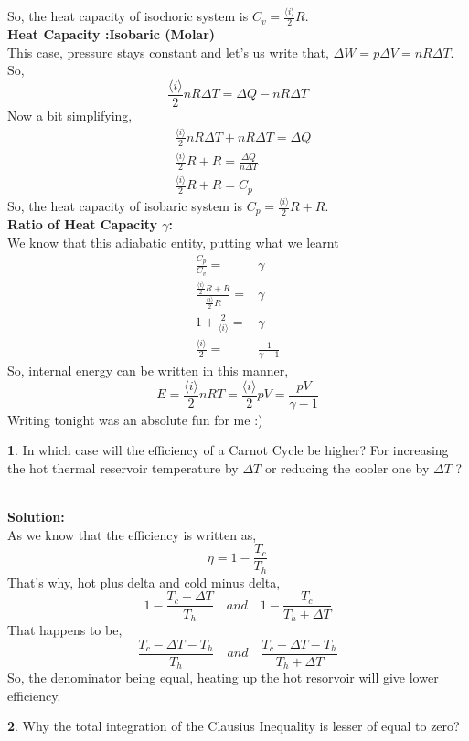 \documentclass[a4paper]{article}
\theoremstyle{definition}
\newtheorem{prob}{ \framebox[0.09\textwidth]{{\sffamily Pr}} }
\newcommand{\pr}[1]{ \begin{tcolorbox} \begin{prob} 
    #1 
\end{prob} 
   \end{tcolorbox}\ 
   \\
 }
\begin{document}
So, the heat capacity of isochoric system is $C_v = \frac{\langle i \rangle}{2}R$.\\
\textbf{Heat Capacity :Isobaric (Molar)} \\
This case, pressure stays constant and let's us write that, $\Delta W =  p \Delta V = nR \Delta T $. So, 
\[ \frac{\langle i \rangle}{2}nR \Delta T = \Delta Q -nR \Delta T \]
Now a bit simplifying, 
\begin{align*}
& \frac{\langle i \rangle}{2}nR \Delta T + nR \Delta T = \Delta Q \\
& \frac{\langle i \rangle}{2}R + R = \frac{\Delta Q }{n \Delta T} \\
&  \frac{\langle i \rangle}{2}R + R = C_p 
\end{align*}
So, the heat capacity of isobaric system is $C_p = \frac{\langle i \rangle}{2}R + R$.\\
\textbf{Ratio of Heat Capacity $\gamma$:} \\
We know that this adiabatic entity, putting what we learnt
\begin{align*}
\frac{C_p}{C_v} =& \gamma \\
\frac{ \frac{\langle i \rangle}{2} R + R } { \frac{\langle i \rangle}{2} R} =& \gamma \\
1 + \frac{2} { \langle i \rangle } =& \gamma \\
 \frac{ \langle i \rangle }{2} =& \frac{1}{\gamma - 1}
\end{align*}
So, internal energy can be written in this manner,
\begin{equation}
E = \frac{\langle i \rangle}{2} nRT = \frac{\langle i \rangle}{2}pV = \frac{pV}{\gamma - 1}
\end{equation}
Writing tonight was an absolute fun for me :)
\pr{In which case will the efficiency of a Carnot Cycle be higher? For increasing the hot thermal
reservoir temperature by $\Delta T$ or reducing the cooler one by $\Delta T$ ?}
\textbf{Solution:}\\ As we know that the efficiency is written as,
\[ \eta = 1 - \frac{T_c}{T_h} \]
That's why, hot plus delta and cold minus delta,
\[ 1 - \frac{ T_c - \Delta T}{T_h} \quad and \quad 1 - \frac{T_c }{T_h + \Delta T} \]
That happens to be, 
\[ \frac{T_c - \Delta T - T_h}{T_h} \quad and \quad \frac{T_c - \Delta T - T_h}{T_h + \Delta T} \]
So, the denominator being equal, heating up the hot resorvoir will give lower efficiency.
\pr{Why the total integration of the Clausius Inequality is lesser of equal to zero?}
\end{document}
